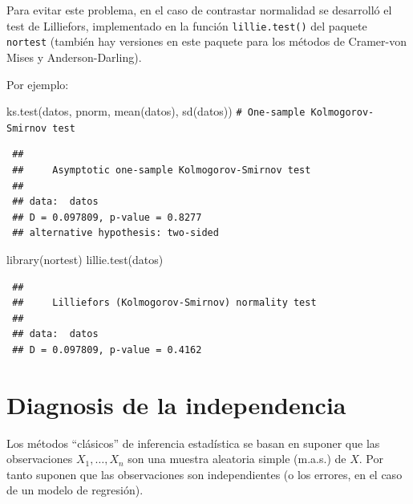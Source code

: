 \documentclass[
]{book}
\newenvironment{Shaded}{\begin{snugshade}}{\end{snugshade}}
\newcommand{\CommentTok}[1]{\textcolor[rgb]{0.56,0.35,0.01}{\textit{#1}}}
\newcommand{\FunctionTok}[1]{\textcolor[rgb]{0.00,0.00,0.00}{#1}}
\newcommand{\NormalTok}[1]{#1}
\theoremstyle{break}
\theoremstyle{nonumberplain}
\renewcommand{\CommentTok}[1]{\textcolor[rgb]{0.41,0.41,0.41}{\texttt{#1}}}
\begin{document}
Para evitar este problema, en el caso de contrastar normalidad se desarrolló el test
de Lilliefors, implementado en la función \texttt{lillie.test()} del paquete \texttt{nortest}
(también hay versiones en este paquete para los métodos de Cramer-von Mises y
Anderson-Darling).

Por ejemplo:

\begin{Shaded}
\begin{Highlighting}[]
\FunctionTok{ks.test}\NormalTok{(datos, pnorm, }\FunctionTok{mean}\NormalTok{(datos), }\FunctionTok{sd}\NormalTok{(datos)) }\CommentTok{\# One{-}sample Kolmogorov{-}Smirnov test}
\end{Highlighting}
\end{Shaded}

\begin{verbatim}
 ## 
 ##     Asymptotic one-sample Kolmogorov-Smirnov test
 ## 
 ## data:  datos
 ## D = 0.097809, p-value = 0.8277
 ## alternative hypothesis: two-sided
\end{verbatim}

\begin{Shaded}
\begin{Highlighting}[]
\FunctionTok{library}\NormalTok{(nortest)}
\FunctionTok{lillie.test}\NormalTok{(datos)}
\end{Highlighting}
\end{Shaded}

\begin{verbatim}
 ## 
 ##     Lilliefors (Kolmogorov-Smirnov) normality test
 ## 
 ## data:  datos
 ## D = 0.097809, p-value = 0.4162
\end{verbatim}

\hypertarget{diag-aleat}{%
\section{Diagnosis de la independencia}\label{diag-aleat}}

Los métodos ``clásicos'' de inferencia estadística se basan en
suponer que las observaciones \(X_{1},\ldots,X_{n}\) son una muestra
aleatoria simple (m.a.s.) de \(X\). Por tanto suponen que
las observaciones son independientes (o los errores, en el caso de un
modelo de regresión).
\end{document}

